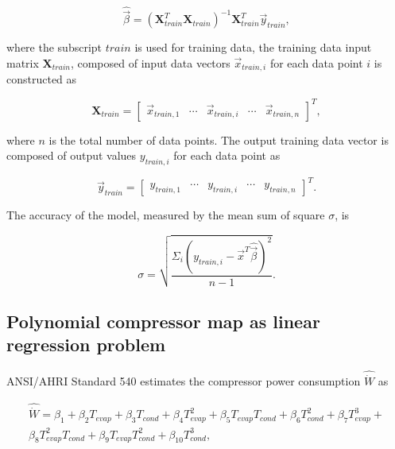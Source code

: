 \begin{equation}
\hat {\vec \beta}  = {({\mathbf{X}}_{train}^T{{\mathbf{X}}_{train}})^{ - 1}}{\mathbf{X}}_{train}^T{\vec y_{train}},
\label{eq:estimte_parameters}
\end{equation}

where the subscript $train$ is used for training data, the training data input matrix ${{\mathbf{X}}_{train}}$, composed of input data vectors ${\vec x}_{train,i}$ for each data point $i$ is constructed as

\begin{equation}
 {{\mathbf{X}}_{train}} = {\left[ {\begin{array}{*{20}{c}} {{{\vec x}_{train,1}}}& \cdots &{{{\vec x}_{train,i}}}& \cdots &{{{\vec x}_{train,n}}}
\end{array}} \right]^T},
\label{eq:input_tr_matrix}
\end{equation}

where $n$ is the total number of data points. The output training data vector is composed of output values $y_{train,i}$ for each data point as

\begin{equation}
{\vec y_{train}} = {\left[ {\begin{array}{*{20}{c}}
  {{y_{train,1}}}& \cdots &{{y_{train,i}}}& \cdots &{{y_{train,n}}} 
\end{array}} \right]^T}.
\label{eq:output_tr_vector}
\end{equation}

The accuracy of the model, measured by the mean sum of square $\sigma$, is 

\begin{equation}
\sigma  = \sqrt {\frac {{\Sigma _i}{{({y_{train,i}} - {{\vec x}^T}\hat {\vec \beta} )}^2}} {n - 1}}.
\label{eq:acc_est_model}
\end{equation}

\subsection{Polynomial compressor map as linear regression problem}
\label{sec:linreg_compmap}
ANSI/AHRI Standard 540 \cite{AHRI:540} estimates the compressor power consumption $\hat {\dot W}$ as

\begin{equation}
\begin{gathered}
  \hat {\dot W} = {\beta _1} + {\beta _2}{T_{evap}} + {\beta _3}{T_{cond}} + {\beta _4}T_{evap}^2 + {\beta _5}{T_{evap}}{T_{cond}} + {\beta _6}T_{cond}^2 + {\beta _7}T_{evap}^3 + \\
  {\beta _8}T_{evap}^2{T_{cond}} + {\beta _9}{T_{evap}}T_{cond}^2   + {\beta _{10}}T_{cond}^3 ,
\end{gathered} 
\label{eq:pwr_map_definition}
\end{equation}

